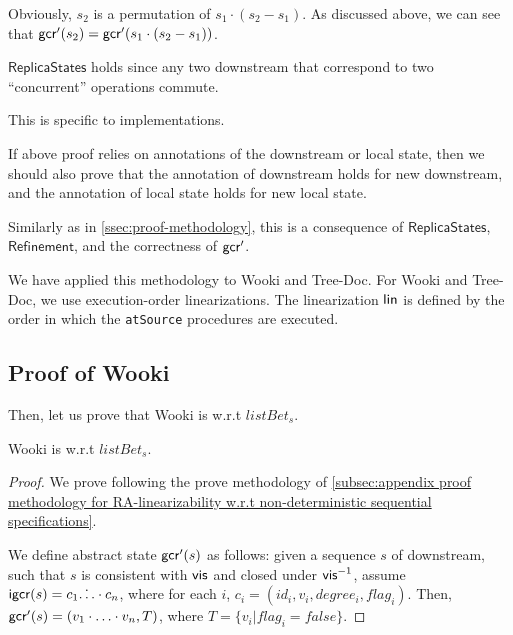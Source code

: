 {\begin{itemize}
    Obviously, $s_2$ is a permutation of $s_1 \cdot (s_2 - s_1)$. As discussed above, we can see that $\mathsf{gcr}'(s_2) = \mathsf{gcr}'(s_1 \cdot (s_2 - s_1))$.
\end{itemize}

 $\mathsf{ReplicaStates}$ holds since any two downstream that correspond to two ``concurrent'' operations commute.

 This is specific to implementations.

 If above proof relies on annotations of the downstream or local state, then we should also prove that the annotation of downstream holds for new downstream, and the annotation of local state holds for new local state.

 Similarly as in \sectionautorefname \ref{ssec:proof-methodology}, this is a consequence of $\mathsf{ReplicaStates}$, $\mathsf{Refinement}$, and the correctness of $\mathsf{gcr}'$.


We have applied this methodology to Wooki and Tree-Doc. For Wooki and Tree-Doc, we use execution-order linearizations. The linearization $\mathsf{lin}$ is defined by the order in which the \lstinline|atSource| procedures are executed.










\subsection{Proof of Wooki}
\label{subsec:proof of Wooki}




Then, let us prove that Wooki is \crdtlinearizable{} w.r.t $\mathit{listBet}_s$.

\begin{lemma}
\label{lemma:Wooki is correct}
Wooki is \crdtlinearizable{} w.r.t $\mathit{listBet}_s$.
\end{lemma}

\begin {proof}

We prove following the prove methodology of \sectionautorefname \ref{subsec:appendix proof methodology for RA-linearizability w.r.t non-deterministic sequential specifications}.

We define abstract state $\mathsf{gcr}'(s)$ as follows: given a sequence $s$ of downstream, such that $s$ is consistent with $\mathsf{vis}$ and closed under $\mathsf{vis}^{-1}$, assume $\mathsf{igcr}(s) = c_1 \dot \ldots \cdot c_n$, where for each $i$, $c_i = (id_i,v_i,degree_i,flag_i)$. Then, $\mathsf{gcr}'(s) = (v_1 \cdot \ldots \cdot v_n,T)$, where $T = \{ v_i \vert flag_i = \mathit{false} \}$.


\end{proof}}
